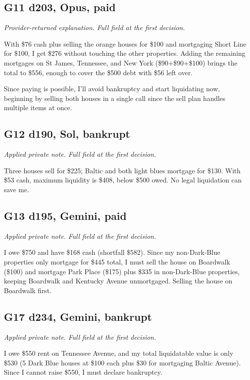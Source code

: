 \subsection*{G11 d203, Opus, paid}
{\small\textit{Provider-returned explanation. Full field at the first decision.}\par With \$76 cash plus selling the orange houses for \$100 and mortgaging Short Line for \$100, I get \$276 without touching the other properties. Adding the remaining mortgages on St James, Tennessee, and New York (\$90+\$90+\$100) brings the total to \$556, enough to cover the \$500 debt with \$56 left over.\par 
\par 
Since paying is possible, I'll avoid bankruptcy and start liquidating now, beginning by selling both houses in a single call since the sell plan handles multiple items at once.\par 
\par 
\par}

\subsection*{G12 d190, Sol, bankrupt}
{\small\textit{Applied private note. Full field at the first decision.}\par Three houses sell for \$225; Baltic and both light blues mortgage for \$130. With \$53 cash, maximum liquidity is \$408, below \$500 owed. No legal liquidation can save me.\par}

\subsection*{G13 d195, Gemini, paid}
{\small\textit{Applied private note. Full field at the first decision.}\par I owe \$750 and have \$168 cash (shortfall \$582). Since my non-Dark-Blue properties only mortgage for \$445 total, I must sell the house on Boardwalk (\$100) and mortgage Park Place (\$175) plus \$335 in non-Dark-Blue properties, keeping Boardwalk and Kentucky Avenue unmortgaged. Selling the house on Boardwalk first.\par}

\subsection*{G17 d234, Gemini, bankrupt}
{\small\textit{Applied private note. Full field at the first decision.}\par I owe \$550 rent on Tennessee Avenue, and my total liquidatable value is only \$530 (5 Dark Blue houses at \$100 each plus \$30 for mortgaging Baltic Avenue). Since I cannot raise \$550, I must declare bankruptcy.\par}

